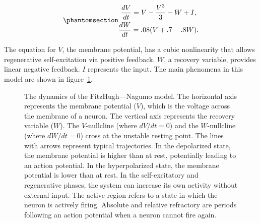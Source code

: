 \documentclass[
  a4paper,
  DIV=11,
  numbers=noendperiod,
  oneside]{scrreprt}
\begin{document}
\begin{equation}\phantomsection\label{eq-ch4n-16-old-36}{
\begin{gathered}
\frac{dV}{dt} = V - \frac{V^{3}}{3} - W + I, \\ 
\frac{dW}{dt} = .08(V + .7 - .8W).
\end{gathered}}\end{equation}

The equation for \(V\), the membrane potential, has a cubic nonlinearity
that allows regenerative self-excitation via positive feedback. \(W\), a
recovery variable, provides linear negative feedback. \(I\) represents
the input. The main phenomena in this model are shown in
figure~\ref{fig-ch4n-img15-old-63}.

\begin{figure}


\caption{\label{fig-ch4n-img15-old-63}The dynamics of the
FitzHugh---Nagumo model. The horizontal axis represents the membrane
potential (\(V\)), which is the voltage across the membrane of a neuron.
The vertical axis represents the recovery variable (\(W\)). The
\(V\)-nullcline (where \(dV/dt = 0\)) and the \(W\)-nullcline (where
\(dW/dt = 0\)) cross at the unstable resting point. The lines with
arrows represent typical trajectories. In the depolarized state, the
membrane potential is higher than at rest, potentially leading to an
action potential. In the hyperpolarized state, the membrane potential is
lower than at rest. In the self-excitatory and regenerative phases, the
system can increase its own activity without external input. The active
region refers to a state in which the neuron is actively firing.
Absolute and relative refractory are periods following an action
potential when a neuron cannot fire again.}

\end{figure}%
\end{document}
